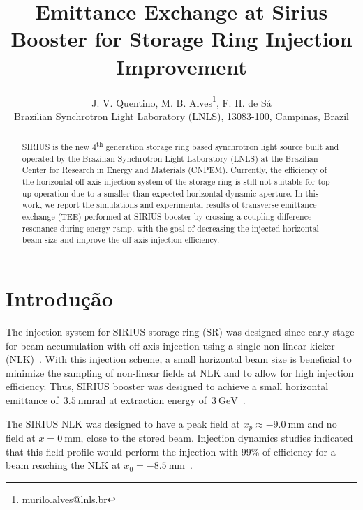 \documentclass[a4paper,
               keeplastbox,   %
              nospread,     %
               ]{jacow}
\begin{document}
\title{Emittance Exchange at Sirius Booster for Storage Ring Injection Improvement}

\author{J. V. Quentino, M. B. Alves\thanks{murilo.alves@lnls.br}, F. H. de Sá \\ Brazilian Synchrotron Light Laboratory (LNLS), 13083-100, Campinas, Brazil}

\maketitle
%
\begin{abstract}
SIRIUS is the new 4\textsuperscript{th} generation storage ring based synchrotron light source built and operated by the Brazilian Synchrotron Light Laboratory (LNLS) at the Brazilian Center for Research in Energy and Materials (CNPEM). Currently, the efficiency of the horizontal off-axis injection system of the storage ring is still not suitable for top-up operation due to a smaller than expected horizontal dynamic aperture. In this work, we report the simulations and experimental results of transverse emittance exchange (TEE) performed at SIRIUS booster by crossing a coupling difference resonance during energy ramp, with the goal of decreasing the injected horizontal beam size and improve the off-axis injection efficiency.
\end{abstract}

\section{Introdução}

The injection system for SIRIUS storage ring (SR) was designed since early stage for beam accumulation with off-axis injection using a single non-linear kicker (NLK)~\cite{Liu:IPAC16-THPMR011}. With this injection scheme, a small horizontal beam size is beneficial to minimize the sampling of non-linear fields at NLK and to allow for high injection efficiency. Thus, SIRIUS booster was designed to achieve a small horizontal emittance of~$\SI{3.5}{\nano\meter\radian}$ at extraction energy of~$\SI{3}{\giga\electronvolt}$~\cite{Liu:IPAC14-WEPRO009}.
 
The SIRIUS NLK was designed to have a peak field at $x_p \approx \SI{-9.0}{\milli \meter}$ and no field at $x=\SI{0}{\milli \meter}$, close to the stored beam. Injection dynamics studies indicated that this field profile would perform the injection with 99\% of efficiency for a beam reaching the NLK at $x_0=\SI{-8.5}{\milli \meter}$~\cite{Liu:IPAC16-THPMR011}.
\end{document}
